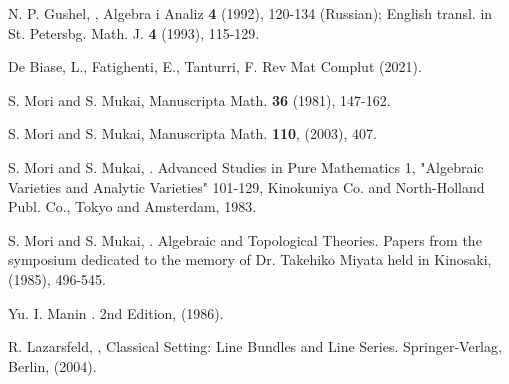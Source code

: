 \documentclass[11pt]{amsart}
\theoremstyle{plain}
\theoremstyle{definition}
\theoremstyle{expl}
\begin{document}
\begin{thebibliography}{19}
N. P. Gushel,
,
\newblock Algebra i Analiz \textbf{4} (1992), 120-134 (Russian); English transl. in St. Petersbg. Math. J. \textbf{4} (1993), 115-129. 

De Biase, L., Fatighenti, E., Tanturri, F.
\newblock Rev Mat Complut (2021).

S. Mori and S. Mukai,
\newblock Manuscripta Math. \textbf{36} (1981), 147-162.

S. Mori and S. Mukai,
\newblock Manuscripta Math. \textbf{110}, (2003), 407.

S. Mori and S. Mukai,
. 
\newblock Advanced Studies in Pure Mathematics 1, "Algebraic Varieties and Analytic Varieties" 101-129, Kinokuniya Co. and North-Holland Publ. Co., Tokyo and Amsterdam, 1983.

S. Mori and S. Mukai,
.
\newblock Algebraic and Topological Theories. Papers from the symposium dedicated to the memory of Dr. Takehiko Miyata held in Kinosaki, (1985), 496-545.

Yu. I. Manin
.
\newblock 2nd Edition, (1986). 

R. Lazarsfeld,
,
\newblock Classical Setting: Line Bundles and Line Series. Springer-Verlag, Berlin, (2004). 




\end{thebibliography}
\end{document}

